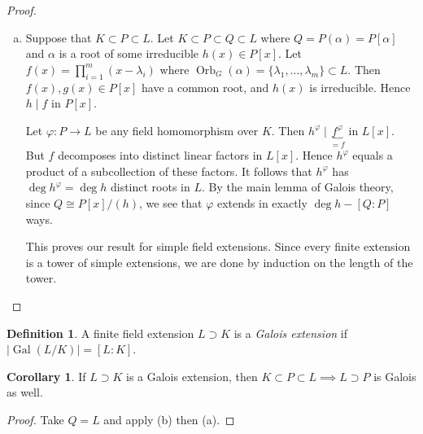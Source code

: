\documentclass[10pt,letterpaper,cm]{nupset}
\theoremstyle{definition}
\newtheorem*{definition}{Definition}
\newtheorem{corollary}{Corollary}
\newtheorem{lemma}{Lemma}
\newcommand{\1}{\mathbf{1}}
\newcommand{\0}{\vec 0}
\DeclareMathOperator{\gal}{Gal}
\DeclareMathOperator{\orb}{Orb}
\begin{document}
\begin{proof}
\begin{enumerate}[(a)]
We have shown that $L = \bigcup_{g\in G} L_g$.
\begin{lemma}
If $K$ is an infinite field and $V$ is a finite-dimensional $K$-vector space and $V_1, V_2, \ldots, V_g \subset V$ are subspaces, then $V= \bigcup_{i=1}^g V_i \implies V = V_k$ for some $k$.
\end{lemma}
\begin{proof}
Suppose that each $V_i \subsetneq V$ and that $V= \bigcup_{i=1}^g V_i $. Then there exists a linear map $f_i : V \to K$ such that $f_i \restriction_{V_i} =0$ and $f_i \ne 0$. Then $f: V \to K$ given by $f = \prod_{i=1}^kf_i$ is the function associates with a nonzero polynomial in $V= K^n$ of degree $s$.  But $f$ is the zero function since $V = \bigcup_{i=1}^k V_i$, a contradiction.
\end{proof}
\item  Suppose that $K \subset P \subset L$. Let $K \subset P \subset Q \subset L$ where $Q = P(\alpha) = P[\alpha]$ and $\alpha$ is a root of some irreducible $h(x) \in P[x]$. Let $f(x) = \prod_{i=1}^m (x-\lambda_i)$ where $\orb_G(\alpha) = \{\lambda_1, \ldots, \lambda_m\} \subset L$. Then $f(x), g(x) \in P[x]$ have a common root, and $h(x)$ is irreducible. Hence $h\mid f$ in $P[x]$.

Let $\varphi : P \to L$ be any field homomorphism over $K$.  Then $h^{\varphi}\mid \underbrace{f^{\varphi}}_{=f}$ in $L[x]$. But $f$ decomposes into distinct linear factors in $L[x]$. Hence $h^{\varphi}$ equals a product of a subcollection of these factors.  It follows that $h^{\varphi}$ has $\deg{h^{\varphi}}= \deg{h}$ distinct roots in $L$. By the main lemma of Galois theory, since $Q \cong P[x]/(h)$, we see that $\varphi$ extends in exactly $\deg{h} - [Q:P]$ ways. 

This proves our result for simple field extensions. Since every finite extension is a tower of simple extensions, we are done by induction on the length of the tower. 
\end{enumerate}
\end{proof}

\begin{definition}
A finite field extension $L \supset K$ is a \textit{Galois extension} if $\lvert{\gal(L/K)}\rvert = [L:K]$.
\end{definition}

\begin{corollary}
If $L\supset K$ is a Galois extension, then $K \subset P \subset L \implies L\supset P$ is Galois as well.
\end{corollary}
\begin{proof}
Take $Q= L$ and apply (b) then (a).
\end{proof}
\end{document}
